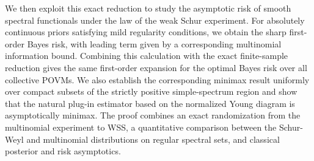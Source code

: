 \documentclass{article}
\theoremstyle{named}
\theoremstyle{named1}
\theoremstyle{plain}
\theoremstyle{remark}
\begin{document}



We then exploit this exact reduction to study the asymptotic risk of smooth
spectral functionals under the law of the weak Schur experiment. For absolutely continuous priors satisfying mild
regularity conditions, we obtain the sharp first-order Bayes risk, with
leading term given by a corresponding multinomial information bound.
Combining this calculation with the exact finite-sample reduction gives the
same first-order expansion for the optimal Bayes risk over all collective
POVMs. We also establish the corresponding minimax result uniformly over
compact subsets of the strictly positive simple-spectrum region and show that the
natural plug-in estimator based on the normalized Young diagram is
asymptotically minimax.
The proof combines an exact randomization from the
multinomial experiment to WSS, a quantitative comparison between the
Schur-Weyl and multinomial distributions on regular spectral sets, and
classical posterior and risk asymptotics. 
\end{document}

